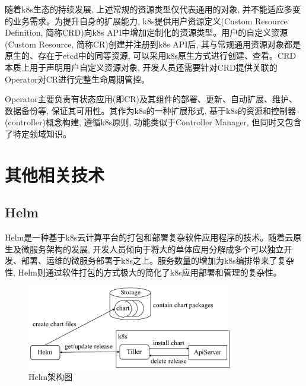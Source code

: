 随着k8s生态的持续发展, 上述常规的资源类型仅代表通用的对象, 并不能适应多变的业务需求。为提升自身的扩展能力, k8s提供用户资源定义(Custom Resource Definition, 简称CRD)向k8s API中增加定制化的资源类型。用户的自定义资源(Custom Resource, 简称CR)创建并注册到k8s API后, 其与常规通用资源对象都是原生的、存在于etcd中的同等资源, 可以采用k8s原生方式进行创建、查看。CRD本质上用于声明用户自定义资源对象, 开发人员还需要针对CRD提供关联的Operator对CR进行完整生命周期管控。

Operator主要负责有状态应用(即CR)及其组件的部署、更新、自动扩展、维护、数据备份等, 保证其可用性。其作为k8s的一种扩展形式, 基于k8s的资源和控制器(controller)概念构建, 遵循k8s原则, 功能类似于Controller Manager, 但同时又包含了特定领域知识。

\section{其他相关技术}\label{section: other_technologies}

\subsection{Helm}

Helm是一种基于k8s云计算平台的打包和部署复杂软件应用程序的技术\cite{spillner2019quality}。随着云原生及微服务架构的发展, 开发人员倾向于将大的单体应用分解成多个可以独立开发、部署、运维的微服务部署于k8s之上。服务数量的增加为k8s编排带来了复杂性, Helm则通过软件打包的方式极大的简化了k8s应用部署和管理的复杂性。

\begin{figure}[h] %
    \centering %
    \includegraphics[width=0.8\textwidth]{FIGs/chapter2/helm.pdf} %
    \caption{Helm架构图} %
    \label{helm} %
\end{figure}%

